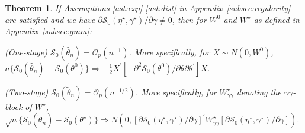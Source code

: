 \documentclass[12pt]{article}
\newtheorem{theorem}{Theorem}
\theoremstyle{definition}
\theoremstyle{remark}
\renewcommand{\appendixname}{Appendix}
\begin{document}
\begin{theorem}
\label{thm:two} If Assumptions \ref{ast:exp}-\ref{ast:dist} in \appendixname\ \ref{subsec:regularity} are satisfied and we have $\partial \mathcal{S}_0(\eta^{\star}, \gamma^{\star}) / \partial \gamma\allowbreak \ne 0$, then for $W^0$ and $W^{\star}$ as defined in \appendixname\ \ref{subsec:gmm}:

\smallskip

\noindent(One-stage) $\mathcal{S}_0(\hat{\theta}_n) = \mathcal{O}_p(n^{-1})$. More specifically, for $X\sim N(0, W^0)$, \\ $n \lbrace \mathcal{S}_0(\hat{\theta}_{n}) - \mathcal{S}_0(\theta^0) \rbrace \Rightarrow - \frac{1}{2} X^{\prime} \left[ - \partial^2 \mathcal{S}_{0}(\theta^0) / \partial \theta \partial \theta^{\prime} \right] X.$


\smallskip

\noindent(Two-stage) $\mathcal{S}_0(\tilde{\theta}_n) = \mathcal{O}_p(n^{-1/2}) $. More specifically, for $W^\star_{\gamma\gamma}$ denoting the $\gamma\gamma$-block of $W^\star$, \\ $\sqrt{n} \lbrace \mathcal{S}_0(\tilde{\theta}_{n}) - \mathcal{S}_{0}(\theta^{\star}) \rbrace \Rightarrow N(0, [\partial \mathcal{S}_{0}(\eta^{\star}, \gamma^{\star}) / \partial \gamma]^{\prime} W^{\star}_{\gamma \gamma} [\partial \mathcal{S}_0(\eta^{\star}, \gamma^{\star}) / \partial \gamma]).$


\end{theorem}
\end{document}
